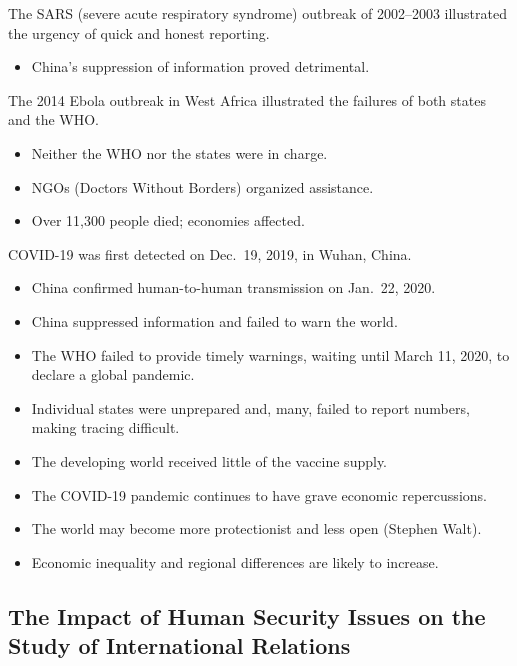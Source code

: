 \documentclass[
]{book}
\providecommand{\tightlist}{%
  \setlength{\itemsep}{0pt}\setlength{\parskip}{0pt}}
\begin{document}
The SARS (severe acute respiratory syndrome) outbreak of 2002--2003 illustrated the urgency of quick and honest reporting.

\begin{itemize}
\tightlist
\item
  China's suppression of information proved detrimental.
\end{itemize}

The 2014 Ebola outbreak in West Africa illustrated the failures of both states and the WHO.

\begin{itemize}
\item
  Neither the WHO nor the states were in charge.
\item
  NGOs (Doctors Without Borders) organized assistance.
\item
  Over 11,300 people died; economies affected.
\end{itemize}

COVID-19 was first detected on Dec.~19, 2019, in Wuhan, China.

\begin{itemize}
\item
  China confirmed human-to-human transmission on Jan.~22, 2020.
\item
  China suppressed information and failed to warn the world.
\item
  The WHO failed to provide timely warnings, waiting until March 11, 2020, to declare a global pandemic.
\item
  Individual states were unprepared and, many, failed to report numbers, making tracing difficult.
\item
  The developing world received little of the vaccine supply.
\item
  The COVID-19 pandemic continues to have grave economic repercussions.
\item
  The world may become more protectionist and less open (Stephen Walt).
\item
  Economic inequality and regional differences are likely to increase.
\end{itemize}

\hypertarget{the-impact-of-human-security-issues-on-the-study-of-international-relations}{%
\subsection{The Impact of Human Security Issues on the Study of International Relations}\label{the-impact-of-human-security-issues-on-the-study-of-international-relations}}
\end{document}
